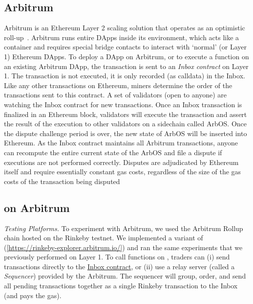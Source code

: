 

\subsection{Arbitrum}

Arbitrum is an Ethereum Layer 2 scaling solution that operates as an optimistic roll-up~\cite{kalodner2018arbitrum}. Arbitrum runs entire DApps inside its environment, which acts like a container and requires special bridge contacts to interact with `normal' (or Layer 1) Ethereum DApps. To deploy a DApp on Arbitrum, or to execute a function on an existing Arbitrum DApp, the transaction is sent to an \textit{Inbox contract} on Layer 1. The transaction is not executed, it is only recorded (as calldata) in the Inbox. Like any other transactions on Ethereum, miners determine the order of the transactions sent to this contract. A set of validators (open to anyone) are watching the Inbox contract for new transactions. Once an Inbox transaction is finalized in an Ethereum block, validators will execute the transaction and assert the result of the execution to other validators on a sidechain called ArbOS. Once the dispute challenge period is over, the new state of ArbOS will be inserted into Ethereum. As the Inbox contract maintains all Arbitrum transactions, anyone can recompute the entire current state of the ArbOS and file a dispute if executions are not performed correctly. Disputes are adjudicated by Ethereum itself and require essentially constant gas costs, regardless of the size of the gas costs of the transaction being disputed


\subsection{\cm on Arbitrum}


\textit{Testing Platforms.} To experiment with Arbitrum, we used the Arbitrum Rollup chain hosted on the Rinkeby testnet. We implemented a variant of \cm(\href{https://rinkeby-explorer.arbitrum.io/address/0x0aa5449a9f7fa34a81ce1dc720563938a27e8b03}{[https://rinkeby-explorer.arbitrum.io/]}) and ran the same experiments that we previously performed on Layer 1. To call functions on \cm, traders can (i) send transactions directly to the \href{https://rinkeby.etherscan.io/address/0x578BAde599406A8fE3d24Fd7f7211c0911F5B29e}{Inbox contract}, or (ii) use a relay server (called a \textit{Sequencer}) provided by the Arbitrum. The sequencer will group, order, and send all pending transactions together as a single Rinkeby transaction to the Inbox (and pays the gas).

